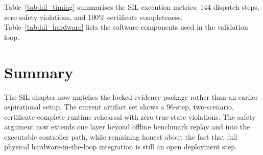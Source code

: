 Table~\ref{tab:hil_timing} summarises the SIL execution metrics: 144
dispatch steps, zero safety violations, and 100\% certificate
completeness.  Table~\ref{tab:hil_hardware} lists the software components
used in the validation loop.



\section{Summary}

The SIL chapter now matches the locked evidence package rather than
an earlier aspirational setup.  The current artifact set shows a 96-step,
two-scenario, certificate-complete runtime rehearsal with zero true-state
violations.  The safety argument now extends one layer beyond offline benchmark
replay and into the executable controller path, while remaining honest about
the fact that full physical hardware-in-the-loop integration is still
an open deployment step.
